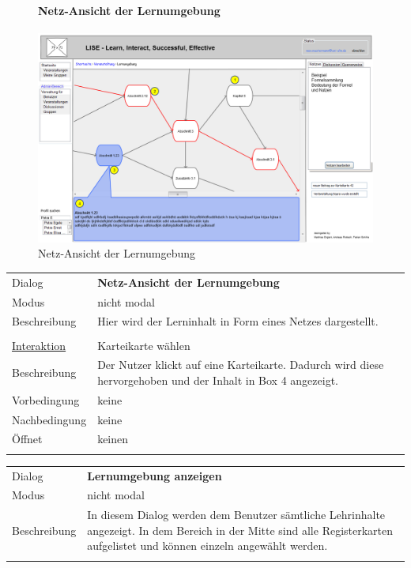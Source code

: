 \documentclass[12pt,a4paper]{article}
\begin{document}
{\begin{figure}[H]
	\paragraph{Netz-Ansicht der Lernumgebung}
	\includegraphics[width=\textwidth]{Bilder/Mockups/GUI/NetzAnsichtKarteikarten.png}
	\caption{Netz-Ansicht der Lernumgebung}
	\label{GuiNetzAnsichtKarteikarten}
\end{figure}
\begin{tabular}{l p{12cm}}
	Dialog 	 & \textbf{Netz-Ansicht der Lernumgebung} \\ 
	Modus & nicht modal\\ 
	Beschreibung   	& Hier wird der Lerninhalt in Form eines Netzes dargestellt. \\\\
	
	\underline{Interaktion} 	 & Karteikarte wählen\\ 
	Beschreibung   	& Der Nutzer klickt auf eine Karteikarte. Dadurch wird diese hervorgehoben und der Inhalt in Box 4 angezeigt.\\
	Vorbedingung	& keine \\
	Nachbedingung	& keine \\
	Öffnet			& keinen\\\\
\end{tabular}

\begin{tabular}{l p{12cm}}
Dialog 	 			& \textbf{Lernumgebung anzeigen} \\ 
Modus 				& nicht modal\\ 
Beschreibung   	 	& In diesem Dialog werden dem Benutzer sämtliche Lehrinhalte angezeigt. In dem Bereich in der Mitte sind alle Registerkarten aufgelistet und können einzeln angewählt werden.\\\\ 


\end{tabular}}
\end{document}
